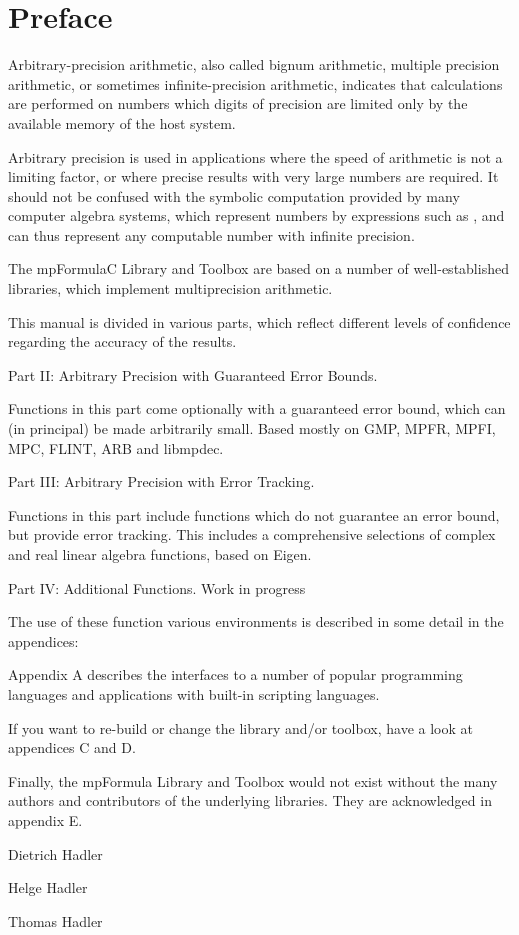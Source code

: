 \chapter{Preface}
\label{Preface} 

Arbitrary-precision arithmetic, also called bignum arithmetic, multiple precision arithmetic, or sometimes infinite-precision arithmetic, indicates that calculations are performed on numbers which digits of precision are limited only by the available memory of the host system. 

\vpara
Arbitrary precision is used in applications where the speed of arithmetic is not a limiting factor, or where precise results with very large numbers are required. It should not be confused with the symbolic computation provided by many computer algebra systems, which represent numbers by expressions such as , and can thus represent any computable number with infinite precision.

\vpara
The mpFormulaC Library and Toolbox are based on a number of well-established libraries, which implement multiprecision arithmetic.

\vpara
This manual is divided in various parts, which reflect different levels of confidence regarding the accuracy of the results.

\vpara
Part II: Arbitrary Precision with Guaranteed Error Bounds.

Functions in this part come optionally with a guaranteed error bound, which can (in principal) be made arbitrarily small.  Based mostly on GMP, MPFR, MPFI, MPC, FLINT, ARB and libmpdec.

\vpara
Part III: Arbitrary Precision with Error Tracking.

Functions in this part include functions which do not guarantee an error bound, but provide error tracking. This includes a comprehensive selections of complex and real linear algebra functions, based on Eigen.

\vpara
Part IV: Additional Functions. Work in progress

\vpara
The use of these function various environments is described in some detail in the appendices:

\vpara
Appendix A describes the interfaces to a number of popular programming languages and applications with built-in scripting languages.

\vpara
If you want to re-build or change the library and/or toolbox, have a look at appendices C and D.

\vpara
Finally, the mpFormula Library and Toolbox would not exist without the many authors and contributors of the underlying libraries. They are acknowledged in appendix E.


\vspace{0.6cm}
Dietrich Hadler

Helge Hadler

Thomas Hadler

